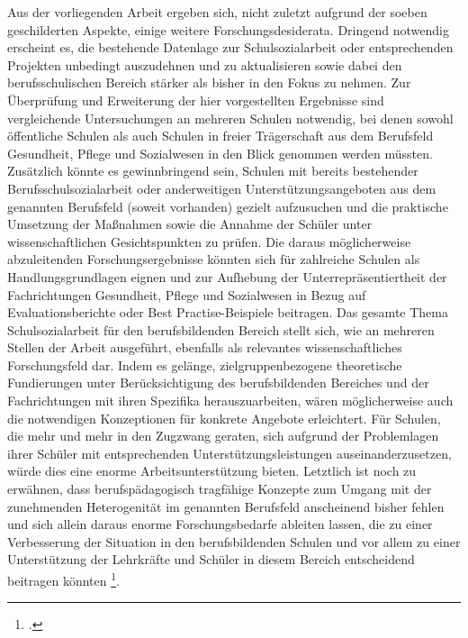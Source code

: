 Aus der vorliegenden Arbeit ergeben sich, nicht zuletzt aufgrund der soeben geschilderten Aspekte, einige weitere Forschungsdesiderata. Dringend notwendig erscheint es, die bestehende Datenlage zur Schulsozialarbeit oder entsprechenden Projekten unbedingt auszudehnen und zu aktualisieren sowie dabei den berufsschulischen Bereich stärker als bisher in den Fokus zu nehmen. Zur Überprüfung und Erweiterung der hier vorgestellten Ergebnisse sind vergleichende Untersuchungen an mehreren Schulen notwendig, bei denen sowohl öffentliche Schulen als auch Schulen in freier Trägerschaft aus dem Berufsfeld Gesundheit, Pflege und Sozialwesen in den Blick genommen werden müssten. Zusätzlich könnte es gewinnbringend sein, Schulen mit bereits bestehender Berufsschulsozialarbeit oder anderweitigen Unterstützungsangeboten aus dem genannten Berufsfeld (soweit vorhanden) gezielt aufzusuchen und die praktische Umsetzung der Maßnahmen sowie die Annahme der Schüler unter wissenschaftlichen Gesichtspunkten zu prüfen. Die daraus möglicherweise abzuleitenden Forschungsergebnisse könnten sich für zahlreiche Schulen als Handlungsgrundlagen eignen und zur Aufhebung der Unterrepräsentiertheit der Fachrichtungen Gesundheit, Pflege und Sozialwesen in Bezug auf Evaluationsberichte oder Best Practise-Beispiele beitragen. Das gesamte Thema Schulsozialarbeit für den berufsbildenden Bereich stellt sich, wie an mehreren Stellen der Arbeit ausgeführt, ebenfalls als relevantes wissenschaftliches Forschungsfeld dar. Indem es gelänge, zielgruppenbezogene theoretische Fundierungen unter Berücksichtigung des berufsbildenden Bereiches und der Fachrichtungen mit ihren Spezifika herauszuarbeiten, wären möglicherweise auch die notwendigen Konzeptionen für konkrete Angebote erleichtert. Für Schulen, die mehr und mehr in den Zugzwang geraten, sich aufgrund der Problemlagen ihrer Schüler mit entsprechenden Unterstützungsleistungen auseinanderzusetzen, würde dies eine enorme Arbeitsunterstützung bieten. Letztlich ist noch zu erwähnen, dass berufspädagogisch tragfähige Konzepte zum Umgang mit der zunehmenden Heterogenität im genannten Berufsfeld anscheinend bisher fehlen und sich allein daraus enorme Forschungsbedarfe ableiten lassen, die zu einer Verbesserung der Situation in den berufsbildenden Schulen und vor allem zu einer Unterstützung der Lehrkräfte und Schüler in diesem Bereich entscheidend beitragen könnten \footcite[vgl.][23ff]{Grassi2012}.

